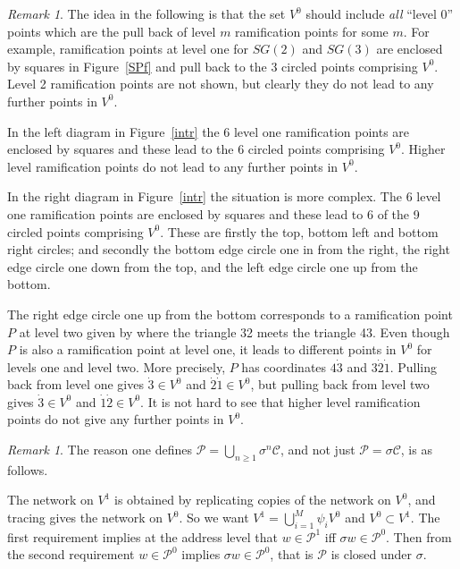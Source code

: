 \documentclass[a4paper]{amsart}
\theoremstyle{plain}
\theoremstyle{definition}
\theoremstyle{remark}
\newtheorem{remark}[theorem]{Remark}
\begin{document}
\begin{remark} The idea in the following is that the set $ V^0 $ should include \emph{all} ``level 0'' points which are the pull back of level $ m $ ramification points for some $ m $.  For example, ramification points at level one for $ SG(2) $ and $ SG(3) $ are enclosed by squares in Figure~\ref{SPf} and pull back to the 3 circled points comprising $ V^0 $.  Level 2 ramification points are not shown, but clearly they do not lead to any further points in $ V^0 $.

In the left diagram in Figure~\ref{intr} the 6 level one ramification points are enclosed by squares and these lead to the 6 circled points comprising $ V^0 $.   Higher level ramification points do not lead to any further points in $ V^0 $.

In the right diagram in Figure~\ref{intr} the situation is more complex.  The  6 level one ramification points are enclosed by squares and these lead to 6 of the 9 circled points comprising $ V^0 $.  These are firstly  the top, bottom left and bottom right circles; and secondly the bottom edge circle one in from the right, the right edge circle one down from the top, and the left edge circle one up from the bottom.

The right edge circle one up from the bottom corresponds to a ramification point $ P $ at level two given by where the triangle 32 meets the triangle 43.  Even though $ P $  is also a ramification point at level one, it leads to different points in  $ V^0 $ for levels one and level two.   More precisely, $ P $ has coordinates $ 4\dot{3} $ and $ 3 \dot{2}\dot{1}$.  Pulling back from level one gives $  \dot{3} \in V^0$ and $  \dot{2}\dot{1}\in V^0$, but pulling back from level two gives $  \dot{3} \in V^0$ and $  \dot{1}\dot{2}\in V^0$.  It is not hard to see that higher level ramification points do not give any further points in $ V^0 $.
\end{remark}
 
\begin{remark}  The reason one defines $\mathcal{P} = \bigcup_{n\geq 1} \sigma^n \mathcal{C}$, and not just $ \mathcal{P} =  \sigma  \mathcal{C}$, is as follows.

The network on $ V^1 $ is obtained by replicating  copies of the network on $ V^0 $, and tracing gives the network on $ V^0 $. So we want $ V^1 = \bigcup_{i=1}^M \psi_i V^{0} $ and $ V^0\subset V^1 $.  
The first requirement implies at the address level that $ w \in \mathcal{P}^1 $ iff   $ \sigma w \in \mathcal{P}^0 $.  Then from the second requirement $ w \in \mathcal{P}^0$ implies $   \sigma w \in \mathcal{P}^0 $, that is $ \mathcal{P} $ is closed under $ \sigma $.  
\end{remark}
\end{document}
